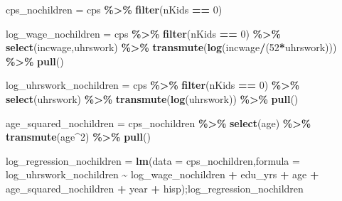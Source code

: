 \documentclass[
]{article}
\newenvironment{Shaded}{\begin{snugshade}}{\end{snugshade}}
\newcommand{\DataTypeTok}[1]{\textcolor[rgb]{0.13,0.29,0.53}{#1}}
\newcommand{\DecValTok}[1]{\textcolor[rgb]{0.00,0.00,0.81}{#1}}
\newcommand{\KeywordTok}[1]{\textcolor[rgb]{0.13,0.29,0.53}{\textbf{#1}}}
\newcommand{\NormalTok}[1]{#1}
\newcommand{\OperatorTok}[1]{\textcolor[rgb]{0.81,0.36,0.00}{\textbf{#1}}}
\newcommand{\StringTok}[1]{\textcolor[rgb]{0.31,0.60,0.02}{#1}}
\begin{document}
\begin{Shaded}
\begin{Highlighting}[]
\NormalTok{cps\_nochildren =}\StringTok{ }\NormalTok{cps }\OperatorTok{\%\textgreater{}\%}
\StringTok{  }\KeywordTok{filter}\NormalTok{(nKids }\OperatorTok{==}\StringTok{ }\DecValTok{0}\NormalTok{)}

\NormalTok{log\_wage\_nochildren =}\StringTok{ }\NormalTok{cps }\OperatorTok{\%\textgreater{}\%}
\StringTok{  }\KeywordTok{filter}\NormalTok{(nKids }\OperatorTok{==}\StringTok{ }\DecValTok{0}\NormalTok{) }\OperatorTok{\%\textgreater{}\%}
\StringTok{  }\KeywordTok{select}\NormalTok{(incwage,uhrswork) }\OperatorTok{\%\textgreater{}\%}
\StringTok{  }\KeywordTok{transmute}\NormalTok{(}\KeywordTok{log}\NormalTok{(incwage}\OperatorTok{/}\NormalTok{(}\DecValTok{52}\OperatorTok{*}\NormalTok{uhrswork))) }\OperatorTok{\%\textgreater{}\%}
\StringTok{  }\KeywordTok{pull}\NormalTok{()}


\NormalTok{log\_uhrswork\_nochildren =}\StringTok{ }\NormalTok{cps }\OperatorTok{\%\textgreater{}\%}
\StringTok{  }\KeywordTok{filter}\NormalTok{(nKids }\OperatorTok{==}\StringTok{ }\DecValTok{0}\NormalTok{) }\OperatorTok{\%\textgreater{}\%}
\StringTok{  }\KeywordTok{select}\NormalTok{(uhrswork) }\OperatorTok{\%\textgreater{}\%}
\StringTok{  }\KeywordTok{transmute}\NormalTok{(}\KeywordTok{log}\NormalTok{(uhrswork)) }\OperatorTok{\%\textgreater{}\%}
\StringTok{  }\KeywordTok{pull}\NormalTok{()}

\NormalTok{age\_squared\_nochildren =}\StringTok{ }\NormalTok{cps\_nochildren }\OperatorTok{\%\textgreater{}\%}
\StringTok{  }\KeywordTok{select}\NormalTok{(age) }\OperatorTok{\%\textgreater{}\%}
\StringTok{  }\KeywordTok{transmute}\NormalTok{(age}\OperatorTok{\^{}}\DecValTok{2}\NormalTok{) }\OperatorTok{\%\textgreater{}\%}
\StringTok{  }\KeywordTok{pull}\NormalTok{()}
\end{Highlighting}
\end{Shaded}

\begin{Shaded}
\begin{Highlighting}[]
\NormalTok{log\_regression\_nochildren =}\StringTok{ }\KeywordTok{lm}\NormalTok{(}\DataTypeTok{data =}\NormalTok{ cps\_nochildren,}\DataTypeTok{formula =}\NormalTok{ log\_uhrswork\_nochildren }\OperatorTok{\textasciitilde{}}\StringTok{ }\NormalTok{log\_wage\_nochildren }\OperatorTok{+}\StringTok{ }\NormalTok{edu\_yrs }\OperatorTok{+}\StringTok{ }\NormalTok{age }\OperatorTok{+}\StringTok{ }\NormalTok{age\_squared\_nochildren }\OperatorTok{+}\StringTok{ }\NormalTok{year }\OperatorTok{+}\StringTok{ }\NormalTok{hisp);log\_regression\_nochildren}
\end{Highlighting}
\end{Shaded}
\end{document}
